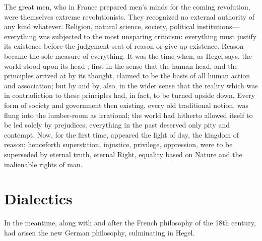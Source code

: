 \documentclass[oneside, 12pt]{book}
\begin{document}
The great men, who in France prepared men's minds for the coming revolution,
were themselves extreme revolutionists. They recognized no external authority of
any kind whatever. Religion, natural science, society, political
institutions---everything was subjected to the most unsparing criticism:
everything must justify its existence before the judgement-seat of reason or
give up existence. Reason became the sole measure of everything. It was the time
when, as Hegel says, the world stood upon its head%
; first in the sense that the human head, and the principles arrived at by its
thought, claimed to be the basis of all human action and association; but by
and by, also, in the wider sense that the reality which was in contradiction to
these principles had, in fact, to be turned upside down. Every form of society
and government then existing, every old traditional notion, was flung into the
lumber-room as irrational; the world had hitherto allowed itself to be led
solely by prejudices; everything in the past deserved only pity and contempt.
Now, for the first time, appeared the light of day, the kingdom of reason;
henceforth superstition, injustice, privilege, oppression, were to be superseded
by eternal truth, eternal Right, equality based on Nature and the inalienable
rights of man.

\printendnotes


\chapter{Dialectics}

In the meantime, along with and after the French philosophy of the 18th century,
had arisen the new German philosophy, culminating in Hegel.
\end{document}
